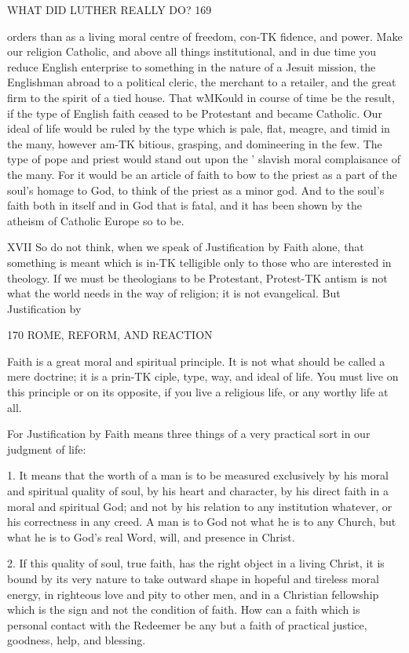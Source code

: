 \documentclass[12pt,a5paper,oneside]{book}
\begin{document}
{WHAT DID LUTHER REALLY DO? 169 

orders than as a living moral centre of freedom, con-TK
fidence, and power. Make our religion Catholic, and 
above all things institutional, and in due time you 
reduce English enterprise to something in the nature 
of a Jesuit mission, the Englishman abroad to a political 
cleric, the merchant to a retailer, and the great firm 
to the spirit of a tied house. That wMKould in course 
of time be the result, if the type of English faith 
ceased to be Protestant and became Catholic. Our 
ideal of life would be ruled by the type which is pale, 
flat, meagre, and timid in the many, however am-TK
bitious, grasping, and domineering in the few. The 
type of pope and priest would stand out upon the 
' slavish moral complaisance of the many. For it would 
be an article of faith to bow to the priest as a part of 
the soul's homage to God, to think of the priest as a 
minor god. And to the soul's faith both in itself and 
in God that is fatal, and it has been shown by the 
atheism of Catholic Europe so to be. 

XVII 
So do not think, when we speak of Justification by 
Faith alone, that something is meant which is in-TK
telligible only to those who are interested in theology. 
If we must be theologians to be Protestant, Protest-TK
antism is not what the world needs in the way of 
religion; it is not evangelical. But Justification by 



170 ROME, REFORM, AND REACTION 

Faith is a great moral and spiritual principle. It is not 
what should be called a mere doctrine; it is a prin-TK
ciple, type, way, and ideal of life. You must live on 
this principle or on its opposite, if you live a religious 
life, or any worthy life at all. 

For Justification by Faith means three things of a 
very practical sort in our judgment of life: 

1. It means that the worth of a man is to be 
measured exclusively by his moral and spiritual quality 
of soul, by his heart and character, by his direct faith 
in a moral and spiritual God; and not by his relation 
to any institution whatever, or his correctness in any 
creed. A man is to God not what he is to any Church, 
but what he is to God's real Word, will, and presence 
in Christ. 

2. If this quality of soul, true faith, has the right 
object in a living Christ, it is bound by its very nature 
to take outward shape in hopeful and tireless moral 
energy, in righteous love and pity to other men, and 
in a Christian fellowship which is the sign and not the 
condition of faith. How can a faith which is personal 
contact with the Redeemer be any but a faith of 
practical justice, goodness, help, and blessing. 

}
\end{document}
